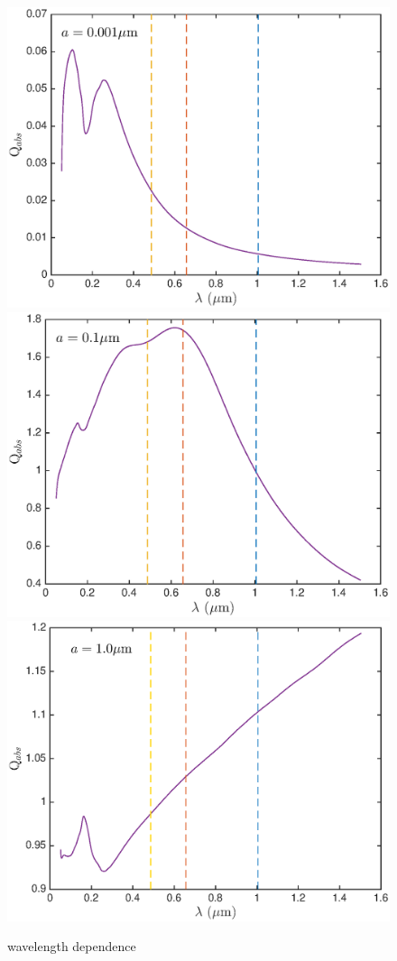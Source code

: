 \documentclass[useAMS,usenatbib,usegraphicx]{mnras}
\begin{document}
\begin{figure}
\includegraphics[trim =30 10 45 15,clip=true,scale=0.35]{Qabs_a0_001}
\includegraphics[trim =51 10 45 15,clip=true,scale=0.35]{Qabs_a0_1}
\includegraphics[trim =48 10 45 15,clip=true,scale=0.35]{Qabs_a1_0}
\caption{wavelength dependence}
\end{figure}
\end{document}
